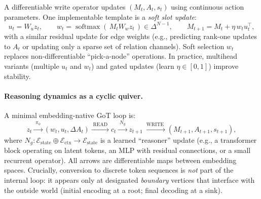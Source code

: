 \documentclass[11pt]{article}
\theoremstyle{definition}
\theoremstyle{plain}
\theoremstyle{remark}
\newcommand{\softmax}{\operatorname{softmax}}
\newcommand{\mc}[1]{\mathcal{#1}}
\newcommand{\Emb}{\mc{E}}
\begin{document}
A differentiable write operator updates $(M_t,A_t,s_t)$ using continuous action parameters.
One implementable template is a \emph{soft slot update}:
\[
u_t = W_u z_t,\qquad
w_t = \softmax(\,M_t W_w z_t\,)\in\Delta^{N-1},
\qquad
M_{t+1}=M_t + \eta\, w_t u_t^\top,
\]
with a similar residual update for edge weights (e.g., predicting rank-one updates to $A_t$ or updating only a sparse set of relation channels).
Soft selection $w_t$ replaces non-differentiable ``pick-a-node'' operations.
In practice, multihead variants (multiple $u_t$ and $w_t$) and gated updates (learn $\eta\in[0,1]$) improve stability.

\paragraph{Reasoning dynamics as a cyclic quiver.}
A minimal embedding-native GoT loop is:
\[
z_t \xrightarrow{\;\pi_\phi\;} (w_t,u_t,\Delta A_t) \xrightarrow{\;\mathrm{READ}\;} c_t \xrightarrow{\;N_g\;} z_{t+1} \xrightarrow{\;\mathrm{WRITE}\;} (M_{t+1},A_{t+1},s_{t+1}),
\]
where $N_g:\Emb_{\text{state}}\oplus\Emb_{\text{ctx}}\to\Emb_{\text{state}}$ is a learned ``reasoner'' update (e.g., a transformer block operating on latent tokens, an MLP with residual connections, or a small recurrent operator).
All arrows are differentiable maps between embedding spaces.
Crucially, conversion to discrete token sequences is \emph{not} part of the internal loop: it appears only at designated \emph{boundary} vertices that interface with the outside world (initial encoding at a root; final decoding at a sink).
\end{document}
